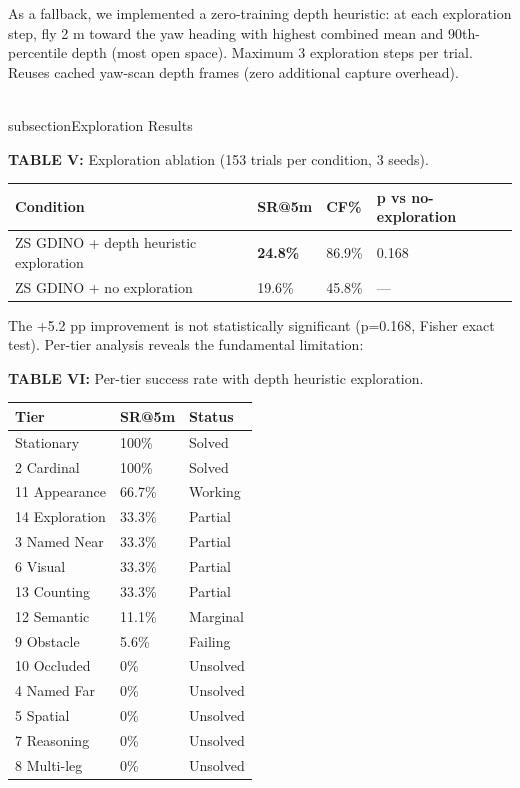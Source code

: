 \documentclass[conference]{IEEEtran}
\begin{document}
As a fallback, we implemented a zero-training depth heuristic: at each
exploration step, fly 2 m toward the yaw heading with highest combined
mean and 90th-percentile depth (most open space). Maximum 3 exploration
steps per trial. Reuses cached yaw-scan depth frames (zero additional
capture overhead).

\\subsection{Exploration Results}\label{c.-exploration-results}

\textbf{TABLE V:} Exploration ablation (153 trials per condition, 3
seeds).

{\def\LTcaptype{none} %
\begin{longtable}[]{@{}llll@{}}
\toprule\noalign{}
Condition & SR@5m & CF\% & p vs no-exploration \\
\midrule\noalign{}
\endhead
\bottomrule\noalign{}
\endlastfoot
ZS GDINO + depth heuristic exploration & \textbf{24.8\%} & 86.9\% &
0.168 \\
ZS GDINO + no exploration & 19.6\% & 45.8\% & --- \\
\end{longtable}
}

The +5.2 pp improvement is not statistically significant (p=0.168,
Fisher exact test). Per-tier analysis reveals the fundamental
limitation:

\textbf{TABLE VI:} Per-tier success rate with depth heuristic
exploration.

{\def\LTcaptype{none} %
\begin{longtable}[]{@{}lll@{}}
\toprule\noalign{}
Tier & SR@5m & Status \\
\midrule\noalign{}
\endhead
\bottomrule\noalign{}
\endlastfoot
1 Stationary & 100\% & Solved \\
2 Cardinal & 100\% & Solved \\
11 Appearance & 66.7\% & Working \\
14 Exploration & 33.3\% & Partial \\
3 Named Near & 33.3\% & Partial \\
6 Visual & 33.3\% & Partial \\
13 Counting & 33.3\% & Partial \\
12 Semantic & 11.1\% & Marginal \\
9 Obstacle & 5.6\% & Failing \\
10 Occluded & 0\% & Unsolved \\
4 Named Far & 0\% & Unsolved \\
5 Spatial & 0\% & Unsolved \\
7 Reasoning & 0\% & Unsolved \\
8 Multi-leg & 0\% & Unsolved \\
\end{longtable}
}
\end{document}
